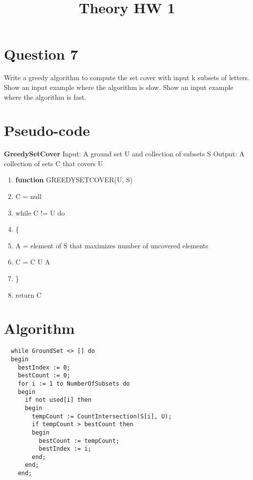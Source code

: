 \documentclass[conference]{IEEEtran}
\begin{document}
\title{Theory HW 1}

\author{
}

\maketitle


\section{Question 7}
%
Write a greedy algorithm to compute the set cover with input k subsets of letters. Show an
input example where the algorithm is slow. Show an input example where the algorithm is fast.



\section{Pseudo-code}

\textbf{GreedySetCover}
\newline
Input: A ground set U and collection of subsets S
Output: A collection of sets C that covers U

\begingroup
\renewcommand\labelenumi{\theenumi:}
\begin{enumerate}
\item \textbf{function} GREEDYSETCOVER(U, S)  \label{item:1}
\item C = null \label{item:2}
\item while C != U do \label{item:3}
\item \{ \label{item:4}
\item \indent A = element of S that maximizes number of uncovered elements \label{item:5}
\item \indent C = C U A \label{item:6}
\item \indent \} \label{item:7}
\item \indent return C \label{item:8}
\end{enumerate}
\endgroup

\section{Algorithm}
\begin{verbatim}
  while GroundSet <> [] do
  begin
    bestIndex := 0;
    bestCount := 0;
    for i := 1 to NumberOfSubsets do
    begin 
      if not used[i] then 
      begin
        tempCount := CountIntersection(S[i], U);
        if tempCount > bestCount then
        begin
          bestCount := tempCount;
          bestIndex := i;
        end;
      end;
    end;
\end{verbatim}
\end{document}
